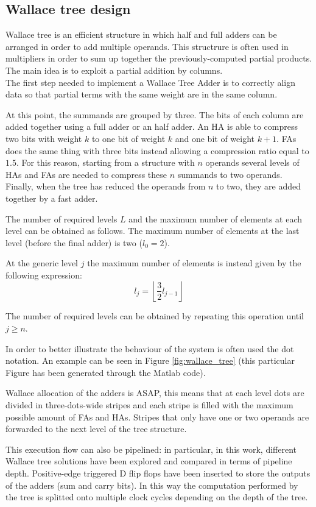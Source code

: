 \subsection{Wallace tree design}

Wallace tree is an efficient structure in which half and full adders can be arranged in order to add multiple operands. This structrure is often used in multipliers in order to sum up together the previously-computed partial products.
The main idea is to exploit a partial addition by columns.\\

The first step needed to implement a Wallace Tree Adder is to correctly align data so that partial terms with the same weight are in the same column.

At this point, the summands are grouped by three. The bits of each column are added together using a full adder or an half adder.
An HA is able to compress two bits with weight $k$ to one bit of weight $k$ and one bit of weight $k+1$. FAs does the same thing with three bits instead allowing a compression ratio equal to $1.5$. 
For this reason, starting from a structure with $n$ operands several levels of HAs and FAs are needed to compress these $n$ summands to two operands. Finally, when the tree has reduced the operands from $n$ to two, they are added together by a fast adder. \cite{Wallace}

The number of required levels $L$ and the maximum number of elements at each level can be obtained as follows.
The maximum number of elements at the last level (before the final adder) is two ($l_0=2$).

At the generic level $j$ the maximum number of elements is instead given by the following expression: 
\[
	l_j=\left\lfloor\dfrac{3}{2}l_{j-1}\right\rfloor
\]

The number of required levels can be obtained by repeating this operation until $j \ge n$.

In order to better illustrate the behaviour of the system is often used the dot notation. An example can be seen in Figure \ref{fig:wallace_tree} (this particular Figure has been generated through the Matlab code).

Wallace allocation of the adders is ASAP, this means that at each level dots are divided in three-dots-wide stripes and each stripe is filled with the maximum possible amount of FAs and HAs.
Stripes that only have one or two operands are forwarded to the next level of the tree structure.

This execution flow can also be pipelined: in particular, in this work, different Wallace tree solutions have been explored and compared in terms of pipeline depth. Positive-edge triggered D flip flops have been inserted to store the outputs of the adders (sum and carry bits). In this way the computation performed by the tree is splitted onto multiple clock cycles depending on the depth of the tree.